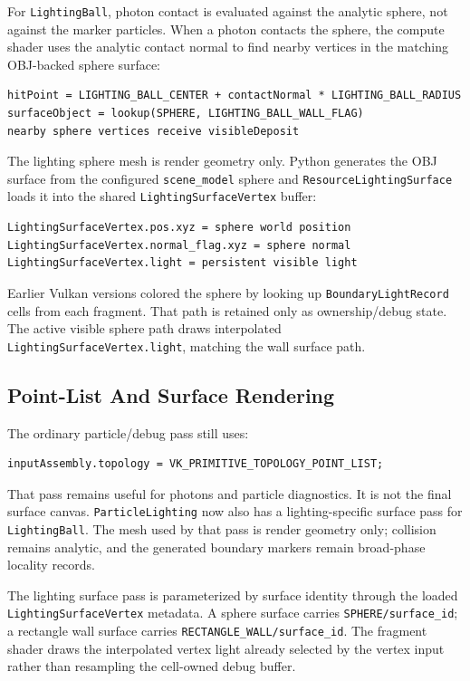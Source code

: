 For \texttt{LightingBall}, photon contact is evaluated against the analytic
sphere, not against the marker particles.  When a photon contacts the sphere,
the compute shader uses the analytic contact normal to find nearby vertices in
the matching OBJ-backed sphere surface:
\begin{verbatim}
hitPoint = LIGHTING_BALL_CENTER + contactNormal * LIGHTING_BALL_RADIUS
surfaceObject = lookup(SPHERE, LIGHTING_BALL_WALL_FLAG)
nearby sphere vertices receive visibleDeposit
\end{verbatim}

The lighting sphere mesh is render geometry only.  Python generates the OBJ
surface from the configured \texttt{scene\_model} sphere and
\texttt{ResourceLightingSurface} loads it into the shared
\texttt{LightingSurfaceVertex} buffer:
\begin{verbatim}
LightingSurfaceVertex.pos.xyz = sphere world position
LightingSurfaceVertex.normal_flag.xyz = sphere normal
LightingSurfaceVertex.light = persistent visible light
\end{verbatim}

Earlier Vulkan versions colored the sphere by looking up
\texttt{BoundaryLightRecord} cells from each fragment.  That path is retained
only as ownership/debug state.  The active visible sphere path draws
interpolated \texttt{LightingSurfaceVertex.light}, matching the wall surface
path.

\subsection{Point-List And Surface Rendering}

The ordinary particle/debug pass still uses:
\begin{verbatim}
inputAssembly.topology = VK_PRIMITIVE_TOPOLOGY_POINT_LIST;
\end{verbatim}

That pass remains useful for photons and particle diagnostics.  It is not the
final surface canvas.  \texttt{ParticleLighting} now also has a
lighting-specific surface pass for \texttt{LightingBall}.  The mesh used by
that pass is render geometry only; collision remains analytic, and the
generated boundary markers remain broad-phase locality records.

The lighting surface pass is parameterized by surface identity through the
loaded \texttt{LightingSurfaceVertex} metadata.  A sphere surface carries
\texttt{SPHERE/surface\_id}; a rectangle wall surface carries
\texttt{RECTANGLE\_WALL/surface\_id}.  The fragment shader draws the
interpolated vertex light already selected by the vertex input rather than
resampling the cell-owned debug buffer.

